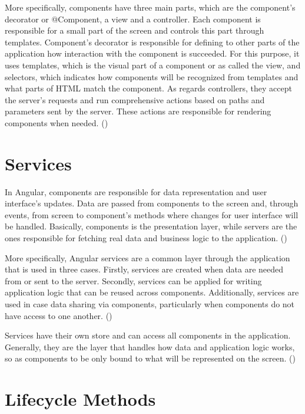 More specifically, components have three main parts, which are the component's decorator or @Component, a view and a controller. Each component is responsible for a small part of the screen and controls this part through templates. Component's decorator is responsible for defining to other parts of the application how interaction with the component is succeeded. For this purpose, it uses templates, which is the visual part of a component or as called the view, and selectors, which indicates how components will be recognized from templates and what parts of HTML match the component. As regards controllers, they accept the server's requests and run comprehensive actions based on paths and parameters sent by the server. These actions are responsible for rendering components when needed. (\cite{murray2018ng}) \par

\section{Services}

In Angular, components are responsible for data representation and user interface's updates. Data are passed from components to the screen and, through events, from screen to component's methods where changes for user interface  will be handled. Basically, components is the presentation layer, while servers are the ones responsible for fetching real data and business logic to the application. (\cite{murray2018ng}) \par

More specifically, Angular services are a common layer through the application that is used in three cases. Firstly, services are created when data are needed from or sent to the server. Secondly, services can be applied for writing application logic that can be reused across components. Additionally, services are used in case data sharing via components, particularly when components do not have access to one another. (\cite{angularUpandRunning}) \par

Services have their own store and can access all components in the application. Generally, they are the layer that handles how data and application logic works, so as components to be only bound to what will be represented on the screen. (\cite{angularUpandRunning}) \par

\section{Lifecycle Methods}

